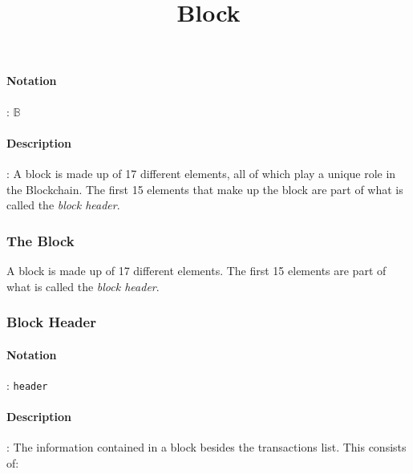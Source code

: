\documentclass[10pt,a4paper,oneside]{scrartcl}
\author{}
\title{Block}
\date{}
\begin{document}
\maketitle
\paragraph{Notation}: $\mathbb{B}$
\paragraph{Description}: A block is made up of 17 different elements, all of which play a unique role in the Blockchain. The first 15 elements that make up the block are part of what is called the \textsl{block header}. 

  \subsubsection{The Block}
                                A block is made up of 17 different elements. The first 15 elements are part of what is called the \textsl{block header}.


                                \subsubsection{Block Header}
                                \paragraph{Notation}: \texttt{header}
                                \paragraph{Description}: The information contained in a block besides the transactions list. This consists of:
\end{document}
